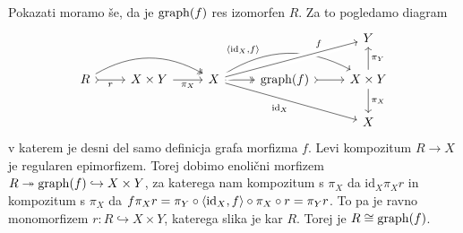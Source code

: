 \documentclass[../kategoricna_logika.tex]{subfiles}
\begin{document}
\begin{dokaz}
\begin{enumerate}[label=(\roman*)]
    Pokazati moramo še, da je $\operatorname{graph}(f)$ res izomorfen $R$. Za to
    pogledamo diagram
    \begin{equation*}
      \begin{tikzcd}
        & & & & Y \\
        R \ar[r, tail, "r"'] \ar[rr, two heads, bend left] & X \times Y \ar[r, "\pi_X"'] &
        X \ar[r, two heads]  \ar[rr, bend left, pos=0.3, "\fprod{\mathrm{id}_X, f}"]
        \ar[urr, crossing over, pos=0.75, "f"] \ar[drr, "\mathrm{id}_X"']  &
        \operatorname{graph}(f) \ar[r, tail] & X \times Y \ar[d, "\pi_X"] \ar[u, "\pi_Y"'] \\
        & & & & X
      \end{tikzcd}
    \end{equation*}
    v katerem je desni del samo definicja grafa morfizma $f$.  Levi
    kompozitum $R \to X$ je regularen epimorfizem.  Torej dobimo
    enolični morfizem
    $R \twoheadrightarrow \operatorname{graph}(f) \hookrightarrow X \times Y$, za
    katerega nam kompozitum s $\pi_X$ da $\mathrm{id}_X \pi_X r$ in
    kompozitum s $\pi_X$ da
    $f \pi_X r = \pi_Y \circ \langle \mathrm{id}_X, f \rangle \circ \pi_X
    \circ r = \pi_Y r$.  To pa je ravno monomorfizem
    $r : R \hookrightarrow X \times Y$, katerega slika je kar $R$.
    Torej je $R \cong \operatorname{graph}(f)$.
  \end{enumerate}
\end{dokaz}
\end{document}

